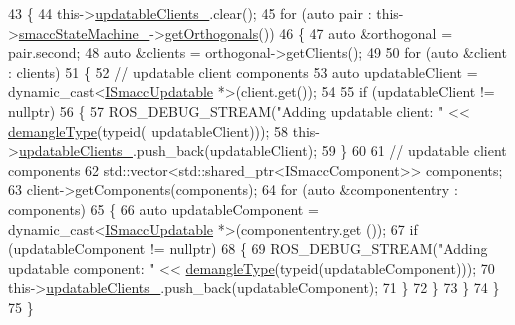 \begin{DoxyCode}
43 \{
44     this->\hyperlink{classsmacc_1_1SignalDetector_a01a457b4ec935473d6426efb7b87e683}{updatableClients\_}.clear();
45     \textcolor{keywordflow}{for} (\textcolor{keyword}{auto} pair : this->\hyperlink{classsmacc_1_1SignalDetector_a46025de6ac7b5980e22144f9703236a4}{smaccStateMachine\_}->\hyperlink{classsmacc_1_1ISmaccStateMachine_a7f5b2882dbd077584767cb2533ed3c49}{getOrthogonals}())
46     \{
47         \textcolor{keyword}{auto} &orthogonal = pair.second;
48         \textcolor{keyword}{auto} &clients = orthogonal->getClients();
49 
50         \textcolor{keywordflow}{for} (\textcolor{keyword}{auto} &client : clients)
51         \{
52             \textcolor{comment}{// updatable client components}
53             \textcolor{keyword}{auto} updatableClient = \textcolor{keyword}{dynamic\_cast<}\hyperlink{classISmaccUpdatable}{ISmaccUpdatable} *\textcolor{keyword}{>}(client.get());
54 
55             \textcolor{keywordflow}{if} (updatableClient != \textcolor{keyword}{nullptr})
56             \{
57                 ROS\_DEBUG\_STREAM(\textcolor{stringliteral}{"Adding updatable client: "} << \hyperlink{namespacesmacc_1_1introspection_a670e39ccea29952859df4e2d0e45077b}{demangleType}(\textcolor{keyword}{typeid}(
      updatableClient)));
58                 this->\hyperlink{classsmacc_1_1SignalDetector_a01a457b4ec935473d6426efb7b87e683}{updatableClients\_}.push\_back(updatableClient);
59             \}
60 
61             \textcolor{comment}{// updatable client components}
62             std::vector<std::shared\_ptr<ISmaccComponent>> components;
63             client->getComponents(components);
64             \textcolor{keywordflow}{for} (\textcolor{keyword}{auto} &componententry : components)
65             \{
66                 \textcolor{keyword}{auto} updatableComponent = \textcolor{keyword}{dynamic\_cast<}\hyperlink{classISmaccUpdatable}{ISmaccUpdatable} *\textcolor{keyword}{>}(componententry.get
      ());
67                 \textcolor{keywordflow}{if} (updatableComponent != \textcolor{keyword}{nullptr})
68                 \{
69                     ROS\_DEBUG\_STREAM(\textcolor{stringliteral}{"Adding updatable component: "} << 
      \hyperlink{namespacesmacc_1_1introspection_a670e39ccea29952859df4e2d0e45077b}{demangleType}(\textcolor{keyword}{typeid}(updatableComponent)));
70                     this->\hyperlink{classsmacc_1_1SignalDetector_a01a457b4ec935473d6426efb7b87e683}{updatableClients\_}.push\_back(updatableComponent);
71                 \}
72             \}
73         \}
74     \}
75 \}
\end{DoxyCode}
